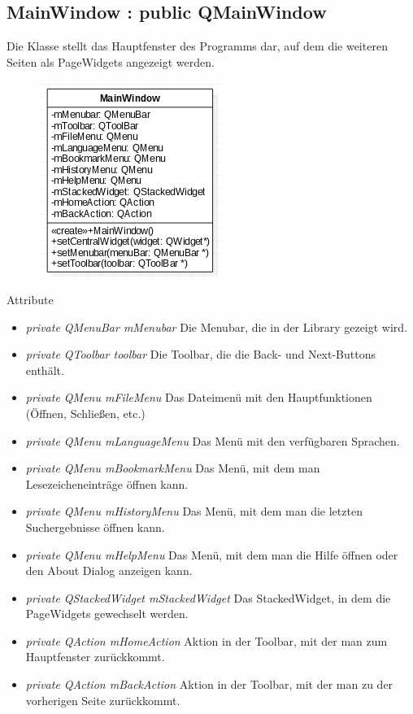 \subsection*{MainWindow : public QMainWindow}
Die Klasse stellt das Hauptfenster des Programms dar, auf dem die weiteren Seiten als PageWidgets angezeigt werden.

\begin{figure}[H]
	\centering
	\includegraphics[scale=0.5]{img/Klassendiagramm/Klassen/View/MainWindow}
	\label{fig:mainWindow}
\end{figure}

Attribute
\begin{itemize}
	\item\textit{private QMenuBar mMenubar}
	Die Menubar, die in der Library gezeigt wird.   
	\item\textit{private QToolbar toolbar}
	Die Toolbar, die die Back- und Next-Buttons enthält.
	\item\textit{private QMenu mFileMenu}
	Das Dateimenü mit den Hauptfunktionen (Öffnen, Schließen, etc.)
	\item\textit{private QMenu mLanguageMenu}
	Das Menü mit den verfügbaren Sprachen.
	\item\textit{private QMenu mBookmarkMenu}
	Das Menü, mit dem man Lesezeicheneinträge öffnen kann.
	\item\textit{private QMenu mHistoryMenu}
	Das Menü, mit dem man die letzten Suchergebnisse öffnen kann.
	\item\textit{private QMenu mHelpMenu}
	Das Menü, mit dem man die Hilfe öffnen oder den About Dialog anzeigen kann.
	\item\textit{private QStackedWidget mStackedWidget}
	Das StackedWidget, in dem die PageWidgets gewechselt werden.
	\item\textit{private QAction mHomeAction}
	Aktion in der Toolbar, mit der man zum Hauptfenster zurückkommt.
	\item\textit{private QAction mBackAction}
	Aktion in der Toolbar, mit der man zu der vorherigen Seite zurückkommt.
\end{itemize}

